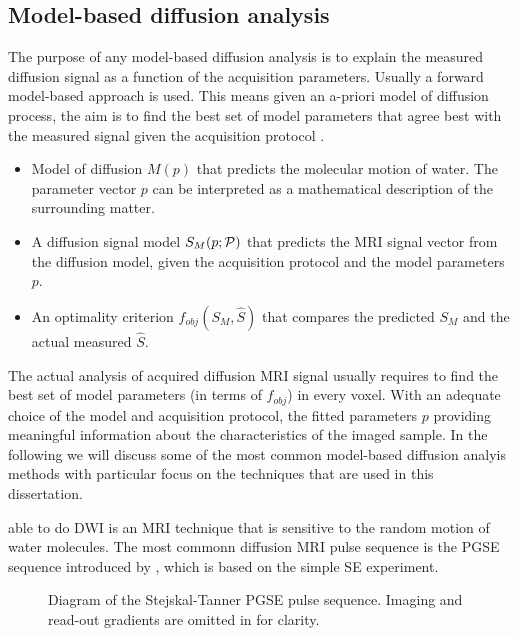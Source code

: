 \subsection*{Model-based diffusion analysis} 
The purpose of any model-based diffusion analysis is to explain the measured diffusion signal as a function of the acquisition parameters. Usually a forward model-based approach is used. This means given an a-priori model of diffusion process, the aim is to find the best set of model parameters that agree best with the measured signal given the acquisition protocol \prot{}.   
\begin{itemize}
	\item Model of diffusion $M(p)$ that predicts the molecular motion of water. The parameter vector $p$ can be interpreted as a mathematical description of the surrounding matter. 
	\item A diffusion signal model $S_{M}(p;\mathcal{P})$ that predicts the MRI signal vector from the diffusion model, given the acquisition protocol \prot{} and the model parameters $p$. 
	\item An optimality criterion $f_{obj}(S_{M},\hat{S})$ that compares the predicted $S_{M}$ and the actual measured $\hat{S}$. 
\end{itemize}
The actual analysis of acquired diffusion MRI signal usually requires to find the best set of model parameters (in terms of $f_{obj}$) in every voxel. With an adequate choice of the model and acquisition protocol, the fitted parameters $p$ providing meaningful information about the characteristics of the imaged sample. In the following we will discuss some of the most common model-based diffusion analyis methods with particular focus on the techniques that are used in this dissertation. 






able to do {\gls{DWI}} is an MRI technique that is sensitive to the random motion of water molecules. The most commonn diffusion MRI pulse sequence is the {\gls{PGSE}} sequence introduced by \cite{Stejskal:1965}, which is based on the simple \gls{SE} experiment. 

\begin{figure}
 \centering
  \caption{Diagram of the Stejskal-Tanner {\protect\gls{PGSE}} pulse sequence. Imaging and read-out gradients are omitted in for clarity.}
  \label{fig:chapter 2 pgse_diagram}
\end{figure}

